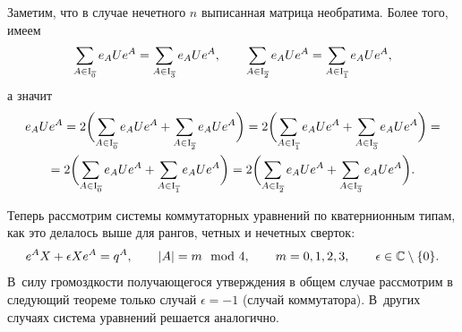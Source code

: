 \smallskip

Заметим, что в случае нечетного $n$ выписанная матрица необратима. 
Более того, имеем
 $$\sum_{A\in{\rm I}_ {\overline 0}} e_A U e^A=\sum_{A\in{\rm I}_ {\overline 3}} e_A U e^A,\qquad \sum_{A\in{\rm I}_ {\overline 2}} e_A U e^A=\sum_{A\in{\rm I}_ {\overline 1}} e_A U e^A,$$
 а значит
 \begin{multline}
e_A U e^A=2 \biggl(\sum_{A\in{\rm I}_ {\overline 0}} e_A U e^A+\sum_{A\in{\rm I}_ {\overline 2}} e_A U e^A\biggr)=2\biggl(\sum_{A\in{\rm I}_ {\overline 1}} e_A U e^A+\sum_{A\in{\rm I}_ {\overline 3}} e_A U e^A\biggr)=
\\
=2\biggl(\sum_{A\in{\rm I}_ {\overline 0}} e_A U e^A+\sum_{A\in{\rm I}_ {\overline 1}} e_A U e^A\biggr)=
2\biggl(\sum_{A\in{\rm I}_ {\overline 2}} e_A U e^A+\sum_{A\in{\rm I}_ {\overline 3}} e_A U e^A\biggr).
\end{multline}

Теперь рассмотрим системы коммутаторных уравнений по кватернионным типам, как это делалось выше для рангов, четных и нечетных сверток:
$$e^A X+\epsilon X e^A=q^A,\qquad |A|=m\mod 4,\qquad m=0, 1, 2, 3,\qquad \epsilon\in{\Bbb C}\setminus\{0\}.$$
В~силу громоздкости получающегося утверждения в общем случае рассмотрим в следующий теореме только случай $\epsilon=-1$ (случай коммутатора). 
В~других случаях система уравнений решается аналогично.

\smallskip

